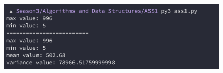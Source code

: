 \documentclass{article}
\begin{document}
\begin{figure}[H]
    \centering
    \includegraphics[width=1\textwidth]{Fig1.png}
\end{figure}
\end{document}
